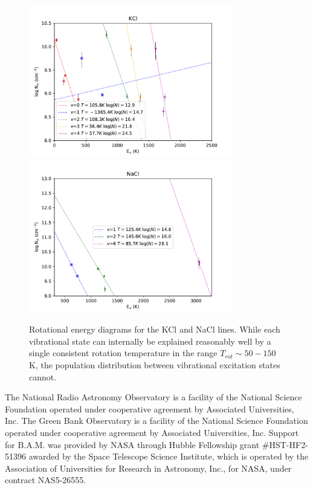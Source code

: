 \documentclass[twocolumn]{aastex62}
\begin{document}
\begin{figure}[!htp]
\includegraphics[scale=1,width=3.5in]{figures/KCl_rotational_diagrams.pdf}
\includegraphics[scale=1,width=3.5in]{figures/NaCl_rotational_diagrams.pdf}
\caption{Rotational energy diagrams for the KCl and NaCl lines.  While each
vibrational state can internally be explained reasonably well by a single
consistent rotation temperature in the range $T_{rot}\sim50-150$ K, the population
distribution between vibrational excitation states cannot.}
\label{fig:rotationdiagrams}
\end{figure}








\acknowledgements
The National Radio Astronomy Observatory is a facility of the National Science Foundation operated under cooperative agreement by Associated Universities, Inc. The Green Bank Observatory is a facility of the National Science Foundation operated under cooperative agreement by Associated Universities, Inc. Support for B.A.M. was provided by NASA through Hubble Fellowship grant \#HST-HF2-51396 awarded by the Space Telescope Science Institute, which is operated by the Association of Universities for Research in Astronomy, Inc., for NASA, under contract NAS5-26555. 


\end{document}
